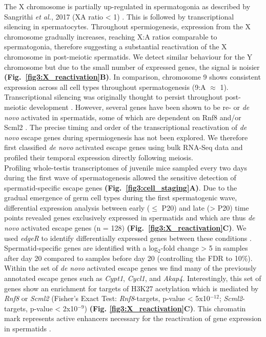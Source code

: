 The X chromosome is partially up-regulated in spermatogonia as described by Sangrithi \emph{et al.}, 2017 (\gls{XA} ratio < 1) \citep{Sangrithi2017}. This is followed by transcriptional silencing in spermatocytes. Throughout spermiogenesis, expression from the X chromosome gradually increases, reaching X:A ratios comparable to spermatogonia, therefore suggesting a substantial reactivation of the X chromosome in post-meiotic spermatids. We detect similar behaviour for the Y chromosome but due to the small number of expressed genes, the signal is noisier \textbf{(Fig.~\ref{fig3:X_reactivation}B)}. In comparison, chromosome 9 shows consistent expression across all cell types throughout spermatogenesis (9:A $\approx$ 1).\\

Transcriptional silencing was originally thought to persist throughout post-meiotic development \citep{Greaves2006, Turner2006}. However, several genes have been shown to be re- or \emph{de novo} activated in spermatids, some of which are dependent on \gls{Rnf8} and/or \gls{Scml2} \citep{Hasegawa2015, Sin2012, Sin2015}. The precise timing and order of the transcriptional reactivation of \emph{de novo} escape genes during spermiogenesis has not been explored. We therefore first classified \emph{de novo} activated escape genes using bulk RNA-Seq data and profiled their temporal expression directly following meiosis.\\

Profiling whole-testis transcriptomes of juvenile mice sampled every two days during the first wave of spermatogenesis allowed the sensitive detection of spermatid-specific escape genes \textbf{(Fig.~\ref{fig3:cell_staging}A)}. Due to the gradual emergence of germ cell types during the first spermatogenic wave, differential expression analysis between early ($\leq$ P20) and late (> P20) time points revealed genes exclusively expressed in spermatids and which are thus \emph{de novo} activated escape genes (n = 128) \textbf{(Fig.~\ref{fig3:X_reactivation}C)}. We used \emph{edgeR} to identify differentially expressed genes between these conditions \citep{Robinson2009}. Spermatid-specific genes are identified with a log$_2$-fold change > 5 in samples after day 20 compared to samples before day 20 (controlling the FDR to 10\%). \\

Within the set of \emph{de novo} activated escape genes we find many of the previously annotated escape genes such as \textit{Cypt1}, \textit{Cycl1}, and \textit{Akap4}. Interestingly, this set of genes show an enrichment for targets of H3K27 acetylation which is mediated by \textit{Rnf8} or \textit{Scml2} (Fisher's Exact Test: \textit{Rnf8}-targets, p-value < 5x10$^{-12}$; \textit{Scml2}-targets, p-value < 2x10$^{-9}$) \textbf{(Fig. \ref{fig3:X_reactivation}C)}. This chromatin mark represents active enhancers necessary for the reactivation of gene expression in spermatids \citep{Adams2018}. \\

